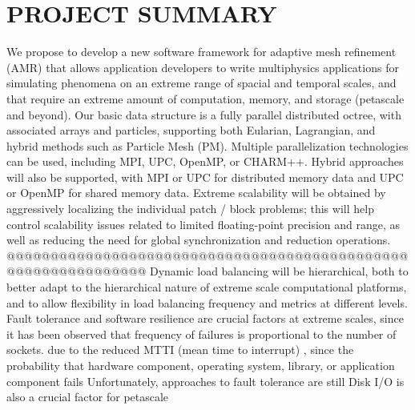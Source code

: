 \documentclass[14pt,letter]{article}
\begin{document}
\tableofcontents

\nocite{StSh09} %
\nocite{WiHy03} %
\nocite{GuWi06} %
\nocite{BuGh08} %
\nocite{BaBu09} %



\section{PROJECT SUMMARY}  \label{s:summary}

We propose to develop a new software framework for adaptive mesh
refinement (AMR) that allows application developers to write
multiphysics applications for simulating phenomena on an extreme range
of spacial and temporal scales, and that require an extreme amount of
computation, memory, and storage (petascale and beyond).
%
%
Our basic data structure is a fully parallel distributed octree, with
associated arrays and particles, supporting both Eularian, Lagrangian,
and hybrid methods such as Particle Mesh (PM).
%
Multiple parallelization technologies can be used, including MPI, UPC,
OpenMP, or CHARM++.  Hybrid approaches will also be supported, with
MPI or UPC for distributed memory data and UPC or OpenMP for shared
memory data.
%
Extreme scalability will be obtained by aggressively localizing the
individual patch / block problems; this will help control scalability issues
related to limited floating-point precision and range, as well as
reducing the need for global synchronization and reduction operations.
%
@@@@@@@@@@@@@@@@@@@@@@@@@@@@@@@@@@@@@@@@@@@@@@@@@@@@@@@@@@@@@@
Dynamic load balancing will be hierarchical, both to better adapt to
the hierarchical nature of extreme scale computational platforms, and
to allow flexibility in load balancing frequency and metrics at different
levels.
%
Fault tolerance and software resilience are crucial factors at extreme scales,
since it has been observed that frequency of failures is proportional to
the number of sockets.
due to the reduced MTTI (mean time to interrupt) , since the probability that hardware component, operating system, library, or application component fails Unfortunately, approaches to fault tolerance are still 
%
Disk I/O is also a crucial factor for petascale 
\end{document}
